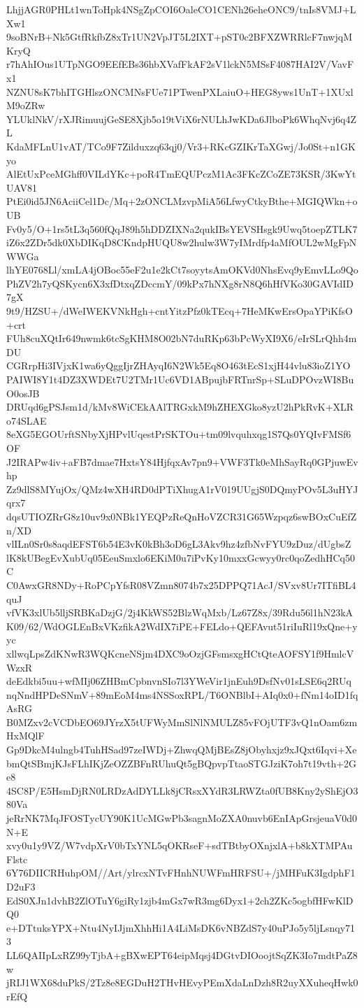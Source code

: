 LhjjAGR0PHLt1wnToHpk4NSgZpCOI6OaleCO1CENh26eheONC9/tnIs8VMJ+LXw1
9soBNrB+Nk5GtfRkfbZ8xTr1UN2VpJT5L2IXT+pST0c2BFXZWRRlcF7nwjqMKryQ
r7hAhIOus1UTpNGO9EEfEBs36hbXVafFkAF2sV1lckN5MSsF4087HAI2V/VavFx1
NZNU8sK7bhITGHlszONCMNsFUe71PTwenPXLaiuO+HEG8yws1UnT+1XUxlM9oZRw
YLUklNkV/rXJRimuujGeSE8Xjb5o19tViX6rNULhJwKDa6JlboPk6WhqNvj6q4ZL
KdaMFLnU1vAT/TCo9F7Zilduxzq63qj0/Vr3+RKcGZIKrTaXGwj/Jo0St+n1GKyo
AlEtUxPceMGhff0VILdYKc+poR4TmEQUPczM1Ac3FKcZCoZE73KSR/3KwYtUAV81
PtEi0id5JN6AciiCel1Dc/Mq+2zONCLMzvpMiA56LfwyCtkyBthe+MGIQWkn+oUB
Fv0y5/O+1rs5tL3q560fQqJ89h5hDDZIXNa2qukIBsYEVSHsgk9Uwq5toepZTLK7
iZ6x2ZDr5dk0XbDIKqD8CKndpHUQU8w2hulw3W7yIMrdfp4aMfOUL2wMgFpNWWGa
lhYE0768Ll/xmLA4jOBoc55eF2u1e2kCt7soyytsAmOKVd0NhsEvq9yEmvLLo9Qo
PhZV2h7yQSKycn6X3xfDtxqZDccmY/09kPx7hNXg8rN8Q6hHfVKo30GAVIdID7gX
9t9/HZSU+/dWeIWEKVNkHgh+cntYitzPfz0kTEcq+7HeMKwErsOpaYPiKfsO+crt
FUh8cuXQtIr649nwmk6tcSgKHM8O02bN7duRKp63bPcWyXI9X6/eIrSLrQhh4mDU
CGRrpHi3IVjxK1wa6yQggIjrZHAyqI6N2Wk5Eq8O463tEcS1xjH44vlu83ioZ1YO
PAIWI8Y1t4DZ3XWDEt7U2TMr1Uc6VD1ABpujbFRTnrSp+SLuDPOvzWI8BuO0osJB
DRUqd6gPSJsm1d/kMv8WiCEkAAlTRGxkM9hZHEXGko8yzU2hPkRvK+XLRo74SLAE
8eXG5EGOUrftSNbyXjHPvlUqestPrSKTOu+tm09lvquhxqg1S7Qs0YQIvFMSf6OF
J2IRAPw4iv+aFB7dmae7HxtsY84HjfqxAv7pn9+VWF3Tk0eMhSayRq0GPjuwEvhp
Zz9dlS8MYujOx/QMz4wXH4RD0dPTiXhugA1rV019UUgjS0DQmyPOv5L3uHYJqrx7
dqsUTIOZRrG8z10uv9x0NBk1YEQPzReQnHoVZCR31G65Wzpqz6swBOxCuEfZn/XD
vlILn0Sr0s8aqdEFST6b54E3vK0kBh3oD6gL3Akv9hz4zfbNvFYU9zDuz/dUgbsZ
lK8kUBegEvXubUq05EeuSmxlo6EKiM0u7iPvKy10mxxGcwyy0rc0qoZedhHCq50C
C0AwxGR8NDy+RoPCpYfsR08VZmn8074b7x25DPPQ71AcJ/SVxv8Ur7ITfiBL4quJ
vfVK3xlUb5lljSRBKaDzjG/2j4KkWS52BlzWqMxb/Lz67Z8x/39Rdu56l1hN23kA
K09/62/WdOGLEnBxVKzfikA2WdIX7iPE+FELdo+QEFAvut51riIuRl19xQne+yyc
xllwqLpsZdKNwR3WQKcneNSjm4DXC9oOzjGFsmsxgHCtQteAOFSY1f9HmlcVWzxR
deEdkbi5uu+wfMIj06ZHBmCpbnvnSIo7l3YWeVir1jnEuh9DsfNv01sLSE6q2RUq
nqNndHPDeSNmV+89mEoM4ms4NSSoxRPL/T6ONBlbI+AIq0x0+fNm14oID1fqAsRG
B0MZxv2cVCDbEO69JYrzX5tUFWyMmSlNlNMULZ85vFOjUTF3vQ1nOam6zmHxMQlF
Gp9DkcM4ulngb4TuhHSad97zeIWDj+ZhwqQMjBEsZ8jObyhxjz9xJQxt6Iqvi+Xe
bmQtSBmjKJsFLhIKjZeOZZBFnRUhuQt5gBQpvpTtaoSTGJziK7oh7t19vth+2Ge8
4SC8P/E5HsmDjRN0LRDzAdDYLLk8jCRsxXYdR3LRWZta0fUB8Kny2yShEjO380Va
jeRrNK7MqJFOSTycUY90K1UcMGwPb3sagnMoZXA0nuvb6EnIApGrsjeuaV0d0N+E
xvy0u1y9VZ/W7vdpXrV0bTxYNL5qOKRseF+sdTBtbyOXnjxlA+b8kXTMPAuFlstc
6Y76DIICRHuhpOM//Art/ylrcxNTvFHnhNUWFmHRFSU+/jMHFuK3IgdphF1D2uF3
EdS0XJn1dvhB2ZlOTuY6giRy1zjb4mGx7wR3mg6Dyx1+2ch2ZKc5ogbfHFwKlDQ0
e+DTtuksYPX+Ntu4NyIJjmXhhHi1A4LiMsDK6vNBZdS7y40uPJo5y5ljLsnqy713
LL6QAIIpLxRZ99yTjbA+gBXwEPT64eipMqsj4DGtvDIOoojtSqZK3Io7mdtPaZ8w
jRIJ1WX68duPkS/2Tz8e8EGDuH2THvHEvyPEmXdaLnDzh8R2uyXXuheqHwk0rEfQ
